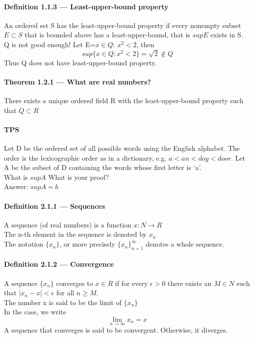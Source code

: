 \documentclass{article}
\begin{document}
\paragraph{Definition 1.1.3 — Least-upper-bound property}
An ordered set S has the least-upper-bound property if every nonempty subset $E\subset S$ that is bounded above has a least-upper-bound, that is $supE$ exists in S.\\
Q is not good enough!
Let E={$x\in Q$: $x^2<2$}, then
$$sup\{x\in Q:x^2<2\}=\sqrt{2}\notin Q$$
Thus Q does not have least-upper-bound property.\\
\paragraph{Theorem 1.2.1 — What are real numbers?}
There exists a unique ordered field R with the least-upper-bound property such that $Q\subset R$
\paragraph{TPS}
Let D be the ordered set of all possible words using the English alphabet. The order is the lexicographic order as in a dictionary, e.g. $a < an < dog < door$. Let A be the subset of D containing the words whose first letter is ‘a’.\\
What is $supA$ What is your proof?\\
Answer: $supA=b$
\paragraph{Definition 2.1.1 — Sequences}
A sequence (of real numbers) is a function $x:N\rightarrow R$\\
The n-th element in the sequence is denoted by $x_n$\\
The notation $\{x_n\}$, or more precisely $\{x_n\}_{n=1}^{\infty}$ denotes a whole sequence.
\paragraph{Definition 2.1.2 — Convergence}
A sequence $\{x_n\}$ converges to $x\in R$ if for every $\epsilon>0$ there exists an $M\in N$ such that $|x_n-x|<\epsilon$ for all $n\ge M$.\\
The number x is said to be the limit of $\{x_n\}$\\
In the case, we write $$\lim_{n\to \infty}x_n=x$$
A sequence that converges is said to be convergent. Otherwise, it diverges.
\end{document}
